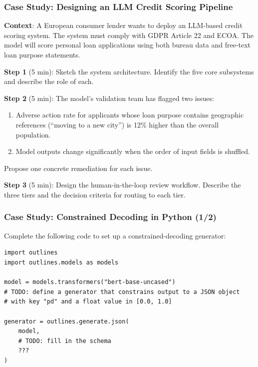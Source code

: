 \documentclass[9pt,t]{beamer}
\begin{document}
\begin{frame}
\frametitle{Case Study: Designing an LLM Credit Scoring Pipeline}

\textbf{Context}: A European consumer lender wants to deploy an LLM-based credit scoring system.
The system must comply with GDPR Article 22 and ECOA. The model will score personal loan
applications using both bureau data and free-text loan purpose statements.

\medskip
\textbf{Step 1} (5 min): Sketch the system architecture. Identify the five core subsystems
and describe the role of each.

\medskip
\textbf{Step 2} (5 min): The model's validation team has flagged two issues:
\begin{enumerate}
  \item Adverse action rate for applicants whose loan purpose contains geographic references (``moving to a new city'') is 12\% higher than the overall population.
  \item Model outputs change significantly when the order of input fields is shuffled.
\end{enumerate}
Propose one concrete remediation for each issue.

\medskip
\textbf{Step 3} (5 min): Design the human-in-the-loop review workflow.
Describe the three tiers and the decision criteria for routing to each tier.
\end{frame}

\begin{frame}[fragile]
\frametitle{Case Study: Constrained Decoding in Python (1/2)}

Complete the following code to set up a constrained-decoding generator:

\begin{lstlisting}
import outlines
import outlines.models as models

model = models.transformers("bert-base-uncased")
# TODO: define a generator that constrains output to a JSON object
# with key "pd" and a float value in [0.0, 1.0]

generator = outlines.generate.json(
    model,
    # TODO: fill in the schema
    ???
)
\end{lstlisting}
\end{frame}
\end{document}
